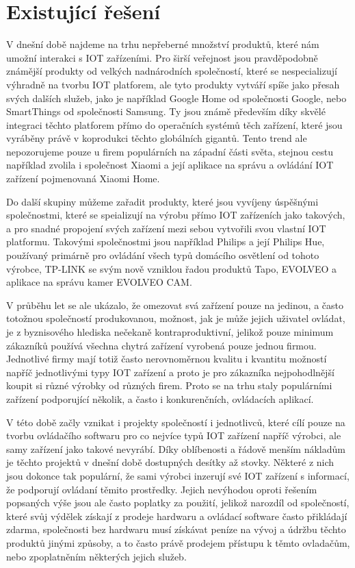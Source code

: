 \section{Existující řešení}

V dnešní době najdeme na trhu nepřeberné množství produktů, které nám umožní interakci s IOT zařízeními. Pro širší veřejnost jsou pravděpodobně známější produkty od velkých nadnárodních společností, které se nespecializují výhradně na tvorbu IOT platforem, ale tyto produkty vytváří spíše jako přesah svých dalších služeb, jako je například Google Home od společnosti Google, nebo SmartThings od společnosti Samsung. Ty jsou známě především díky skvělé integraci těchto platforem přímo do operačních systémů těch zařízení, které jsou vyráběny právě v koprodukci těchto globálních gigantů. Tento trend ale nepozorujeme pouze u firem populárních na západní části světa, stejnou cestu například zvolila i společnost Xiaomi a její aplikace na správu a ovládání IOT zařízení pojmenovaná Xiaomi Home.

Do další skupiny můžeme zařadit produkty, které jsou vyvíjeny úspěšnými společnostmi, které se speializují na výrobu přímo IOT zařízeních jako takových, a pro snadné propojení svých zařízení mezi sebou vytvořili svou vlastní IOT platformu. Takovými společnostmi jsou například Philips a její Philips Hue, používaný primárně pro ovládání všech typů domácího osvětlení od tohoto výrobce, TP-LINK se svým nově vzniklou řadou produktů Tapo, EVOLVEO a aplikace na správu kamer EVOLVEO CAM.

V průběhu let se ale ukázalo, že omezovat svá zařízení pouze na jedinou, a často totožnou společností produkovanou, možnost, jak je může jejich uživatel ovládat, je z byznisového hlediska nečekaně kontraproduktivní, jelikož pouze minimum zákazníků používá všechna chytrá zařízení vyrobená pouze jednou firmou. Jednotlivé firmy mají totiž často nerovnoměrnou kvalitu i kvantitu možností napříč jednotlivými typy IOT zařízení a proto je pro zákazníka nejpohodlnější koupit si různé výrobky od různých firem. Proto se na trhu staly populárními zařízení podporující několik, a často i konkurenčních, ovládacích aplikací.

V této době začly vznikat i projekty společností i jednotlivců, které cílí pouze na tvorbu ovládačího softwaru pro co nejvíce typů IOT zařízení napříč výrobci, ale samy zařízení jako takové nevyrábí. Díky oblíbenosti a řádově menším nákladům je těchto projektů v dnešní době dostupných desítky až stovky. Některé z nich jsou dokonce tak populární, že sami výrobci inzerují své IOT zařízení s informací, že podporují ovládaní těmito prostředky. Jejich nevýhodou oproti řešením popsaných výše jsou ale často poplatky za použití, jelikož narozdíl od společností, které svůj výdělek získají z prodeje hardwaru a ovládací software často přikládají zdarma, společnosti bez hardwaru musí získávat peníze na vývoj a údržbu těchto produktů jinými způsoby, a to často právě prodejem přístupu k těmto ovladačům, nebo zpoplatněním některých jejich služeb.


